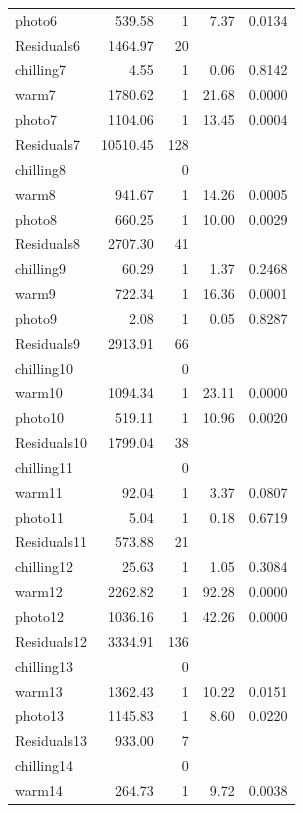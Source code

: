 \documentclass{article}\usepackage[]{graphicx}\usepackage[]{color}
\begin{document}
\begin{table}[ht]
\begin{tabular}{lrrrr}
  photo6 & 539.58 & 1 & 7.37 & 0.0134 \\ 
  Residuals6 & 1464.97 & 20 &  &  \\ 
   \hline
chilling7 & 4.55 & 1 & 0.06 & 0.8142 \\ 
  warm7 & 1780.62 & 1 & 21.68 & 0.0000 \\ 
  photo7 & 1104.06 & 1 & 13.45 & 0.0004 \\ 
  Residuals7 & 10510.45 & 128 &  &  \\ 
   \hline
chilling8 &  & 0 &  &  \\ 
  warm8 & 941.67 & 1 & 14.26 & 0.0005 \\ 
  photo8 & 660.25 & 1 & 10.00 & 0.0029 \\ 
  Residuals8 & 2707.30 & 41 &  &  \\ 
   \hline
chilling9 & 60.29 & 1 & 1.37 & 0.2468 \\ 
  warm9 & 722.34 & 1 & 16.36 & 0.0001 \\ 
  photo9 & 2.08 & 1 & 0.05 & 0.8287 \\ 
  Residuals9 & 2913.91 & 66 &  &  \\ 
   \hline
chilling10 &  & 0 &  &  \\ 
  warm10 & 1094.34 & 1 & 23.11 & 0.0000 \\ 
  photo10 & 519.11 & 1 & 10.96 & 0.0020 \\ 
  Residuals10 & 1799.04 & 38 &  &  \\ 
   \hline
chilling11 &  & 0 &  &  \\ 
  warm11 & 92.04 & 1 & 3.37 & 0.0807 \\ 
  photo11 & 5.04 & 1 & 0.18 & 0.6719 \\ 
  Residuals11 & 573.88 & 21 &  &  \\ 
   \hline
chilling12 & 25.63 & 1 & 1.05 & 0.3084 \\ 
  warm12 & 2262.82 & 1 & 92.28 & 0.0000 \\ 
  photo12 & 1036.16 & 1 & 42.26 & 0.0000 \\ 
  Residuals12 & 3334.91 & 136 &  &  \\ 
   \hline
chilling13 &  & 0 &  &  \\ 
  warm13 & 1362.43 & 1 & 10.22 & 0.0151 \\ 
  photo13 & 1145.83 & 1 & 8.60 & 0.0220 \\ 
  Residuals13 & 933.00 & 7 &  &  \\ 
   \hline
chilling14 &  & 0 &  &  \\ 
  warm14 & 264.73 & 1 & 9.72 & 0.0038 \\ 

\end{tabular}
\end{table}
\end{document}
